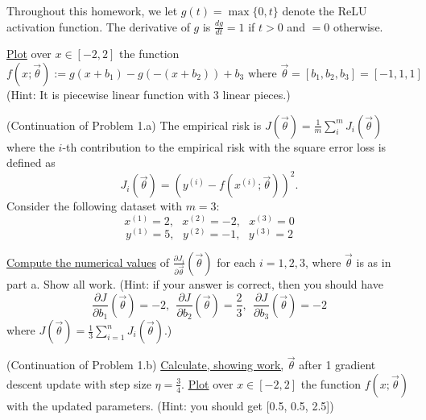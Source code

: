 \documentclass[
	number={1}
]{cs577homework}
\begin{document}
\maketitle

Throughout this homework, we let $g(t) = \max\{0, t\}$ denote the ReLU activation function.
The derivative of $g$ is $\frac{dg}{dt}=1$ if $t > 0$ and $= 0$ otherwise.

\problemline

\underline{Plot} over $x \in [-2, 2]$ the function
\[ f(x; \vec{\theta}) := g(x + b_{1}) - g(-(x + b_{2})) + b_{3} \text{  where  } \vec{\theta} = [b_{1}, b_{2}, b_{3}] = [-1, 1, 1] \]
(Hint: It is piecewise linear function with 3 linear pieces.)

\problemline

(Continuation of Problem 1.a)
The empirical risk is $J(\vec{\theta}) = \frac{1}{m} \sum_{i}^{m} J_{i}(\vec{\theta})$ where the $i$-th contribution to the empirical risk with the square error loss is defined as
\[ J_{i}(\vec{\theta}) = \left( y^{(i)} - f\left( x^{(i)}; \vec{\theta} \right) \right)^{2}. \]
Consider the following dataset with $m = 3$:
\begin{equation}
	x^{(1)} = 2, \ \ \ x^{(2)} = -2, \ \ \ x^{(3)} = 0
	\label{eq:1.b.x}
\end{equation}
%
\begin{equation}
	y^{(1)} = 5, \ \ \ y^{(2)} = -1, \ \ \ y^{(3)} = 2
	\label{eq:1.b.y}
\end{equation}

\underline{Compute the numerical values} of $\frac{\partial J_{i}}{\partial \vec{\theta}}(\vec{\theta})$ for each $i = 1, 2, 3$, where $\vec{\theta}$ is as in part a.
Show all work.
(Hint: if your answer is correct, then you should have
\begin{equation}
	\frac{\partial J}{\partial b_{1}} (\vec{\theta}) = -2,\ \
	\frac{\partial J}{\partial b_{2}} (\vec{\theta}) = \frac{2}{3},\ \
	\frac{\partial J}{\partial b_{3}} (\vec{\theta}) = -2
	\label{eq:1.b.3}
\end{equation}
where $J(\vec{\theta}) = \frac{1}{3}\sum_{i=1}^{n} J_{i}(\vec{\theta})$.)
\addanswer{1b}

\problemline

(Continuation of Problem 1.b)
\underline{Calculate, showing work,} $\vec{\theta}$ after 1 gradient descent update with step size $\eta = \frac{3}{4}$.
\underline{Plot} over $x \in [-2, 2]$ the function $f(x; \vec{\theta})$ with the updated parameters.
(Hint: you should get [0.5, 0.5, 2.5])
\addanswer{1c}
\end{document}

